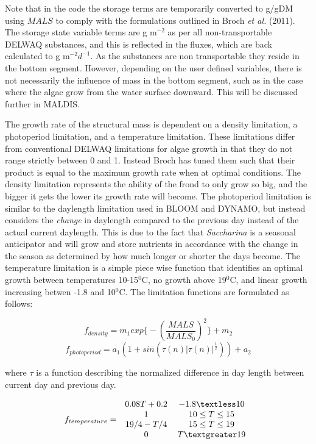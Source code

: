 \documentclass{deltares_manual}
\begin{document}
Note that in the code the storage terms are temporarily converted to g/gDM using $MALS$ to comply with the formulations outlined in Broch \textit{et al.} (2011). The storage state variable terms are g m$^{-2}$ as per all non-transportable DELWAQ substances, and this is reflected in the fluxes, which are back calculated to g m$^{-2}d^{-1}$. As the substances are non transportable they reside in the bottom segment. However, depending on the user defined variables, there is not necessarily the influence of mass in the bottom segment, such as in the case where the algae grow from the water surface downward. This will be discussed further in MALDIS.

The growth rate of the structural mass is dependent on a density limitation, a photoperiod limitation, and a temperature limitation. These limitations differ from conventional DELWAQ limitations for algae growth in that they do not range strictly between 0 and 1. Instead Broch has tuned them such that their product is equal to the maximum growth rate when at optimal conditions. The density limitation represents the ability of the frond to only grow so big, and the bigger it gets the lower its growth rate will become. The photoperiod limitation is similar to the daylength limitation used in BLOOM and DYNAMO, but instead considers the \textit{change} in daylength compared to the previous day instead of the actual current daylength. This is due to the fact that \textit{Saccharina} is a seasonal anticipator and will grow and store nutrients in accordance with the change in the season as determined by how much longer or shorter the days become. The temperature limitation is a simple piece wise function that identifies an optimal growth between temperatures 10-15$^0$C, no growth above 19$^0$C, and linear growth increasing betwen -1.8 and 10$^0$C.  The limitation functions are formulated as follows:

\[f_{density} = m_1 exp\big\{-(\frac{MALS}{MALS_0})^2 \big\}+m_2\]
\[f_{photoperiod} = a_1 (1+sin(\tau (n) | \tau (n)| ^{\frac{1}{2}})) + a_2\]

where $\tau$ is a function describing the normalized difference in day length between current day and previous day.

\[f_{temperature} =  
\left 
.\begin{tabular}{cc}
$ 0.08T + 0.2 $    & $-1.8 \textless 10$ \\
$  1 $             & $10 \leq T \leq 15$ \\
$19/4 - T/4$       & $15 \leq T \leq 19$ \\ 
$0$                & $T \textgreater 19$ \\
\end{tabular}
\right 
.\]
\end{document}

